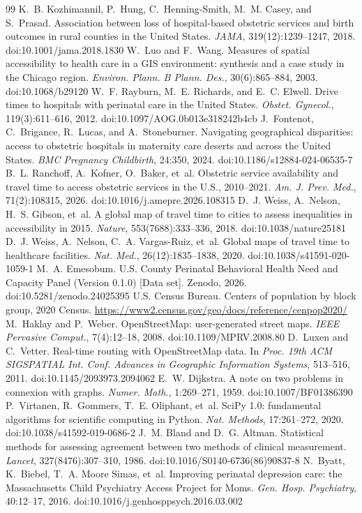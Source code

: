 \documentclass[10pt,twocolumn,letterpaper]{article}
\begin{document}
\begin{thebibliography}{99}
 K.~B. Kozhimannil, P.~Hung, C.~Henning-Smith, M.~M. Casey, and S.~Prasad. Association between loss of hospital-based obstetric services and birth outcomes in rural counties in the United States. \emph{JAMA}, 319(12):1239--1247, 2018. doi:10.1001/jama.2018.1830
 W.~Luo and F.~Wang. Measures of spatial accessibility to health care in a GIS environment: synthesis and a case study in the Chicago region. \emph{Environ. Plann. B Plann. Des.}, 30(6):865--884, 2003. doi:10.1068/b29120
 W.~F. Rayburn, M.~E. Richards, and E.~C. Elwell. Drive times to hospitals with perinatal care in the United States. \emph{Obstet. Gynecol.}, 119(3):611--616, 2012. doi:10.1097/AOG.0b013e318242b4cb
 J.~Fontenot, C.~Brigance, R.~Lucas, and A.~Stoneburner. Navigating geographical disparities: access to obstetric hospitals in maternity care deserts and across the United States. \emph{BMC Pregnancy Childbirth}, 24:350, 2024. doi:10.1186/s12884-024-06535-7
 B.~L. Ranchoff, A.~Kofner, O.~Baker, et~al. Obstetric service availability and travel time to access obstetric services in the U.S., 2010--2021. \emph{Am. J. Prev. Med.}, 71(2):108315, 2026. doi:10.1016/j.amepre.2026.108315
 D.~J. Weiss, A.~Nelson, H.~S. Gibson, et~al. A global map of travel time to cities to assess inequalities in accessibility in 2015. \emph{Nature}, 553(7688):333--336, 2018. doi:10.1038/nature25181
 D.~J. Weiss, A.~Nelson, C.~A. Vargas-Ruiz, et~al. Global maps of travel time to healthcare facilities. \emph{Nat. Med.}, 26(12):1835--1838, 2020. doi:10.1038/s41591-020-1059-1
 M.~A. Emesobum. U.S. County Perinatal Behavioral Health Need and Capacity Panel (Version 0.1.0) [Data set]. Zenodo, 2026. doi:10.5281/zenodo.24025395
 U.S. Census Bureau. Centers of population by block group, 2020 Census. \url{https://www2.census.gov/geo/docs/reference/cenpop2020/}
 M.~Haklay and P.~Weber. OpenStreetMap: user-generated street maps. \emph{IEEE Pervasive Comput.}, 7(4):12--18, 2008. doi:10.1109/MPRV.2008.80
 D.~Luxen and C.~Vetter. Real-time routing with OpenStreetMap data. In \emph{Proc. 19th ACM SIGSPATIAL Int. Conf. Advances in Geographic Information Systems}, 513--516, 2011. doi:10.1145/2093973.2094062
 E.~W. Dijkstra. A note on two problems in connexion with graphs. \emph{Numer. Math.}, 1:269--271, 1959. doi:10.1007/BF01386390
 P.~Virtanen, R.~Gommers, T.~E. Oliphant, et~al. SciPy 1.0: fundamental algorithms for scientific computing in Python. \emph{Nat. Methods}, 17:261--272, 2020. doi:10.1038/s41592-019-0686-2
 J.~M. Bland and D.~G. Altman. Statistical methods for assessing agreement between two methods of clinical measurement. \emph{Lancet}, 327(8476):307--310, 1986. doi:10.1016/S0140-6736(86)90837-8
 N.~Byatt, K.~Biebel, T.~A. Moore Simas, et~al. Improving perinatal depression care: the Massachusetts Child Psychiatry Access Project for Moms. \emph{Gen. Hosp. Psychiatry}, 40:12--17, 2016. doi:10.1016/j.genhosppsych.2016.03.002
\end{thebibliography}
\end{document}
